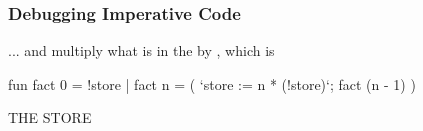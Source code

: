 \documentclass[aspectratio=169, handout]{beamer}
\begin{document}
\begin{frame}[fragile]
  \frametitle{Debugging Imperative Code}

  \begin{minipage}[t][0.6in][t]{\textwidth}
    ... and multiply what is in the  by , which is 
  \end{minipage}

  \vspace{10pt}

  \begin{center}
    \begin{minipage}[t][1.7in][t]{0.6\textwidth}
      \vspace{\fill}
      \begin{codeblock}
        fun fact 0 = !store
          | fact n =
              ( `store := n * (!store)`;
                fact (n - 1)
              )
      \end{codeblock}
      \vspace{\fill}
    \end{minipage}
    \hfill\vline\hfill
    \begin{minipage}[t][1.7in][t]{0.3\textwidth}
      \centering
      {\hspace{-20pt}\color{gray} \large THE STORE}

      \vspace{\fill}
      \vspace{\fill}
    \end{minipage}
  \end{center}
\end{frame}
\end{document}
